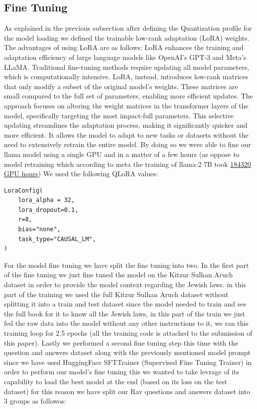 \documentclass[11pt]{article}
\begin{document}
\subsection{Fine Tuning}
As explained in the previous subsection after defining the Quantization profile for the model loading we defined the trainable low-rank adaptation (LoRA) weights. The advantages of using LoRA are as follows:  
LoRA enhances the training and adaptation efficiency of large language models like OpenAI’s GPT-3 and Meta’s LLaMA. Traditional fine-tuning methods require updating all model parameters, which is computationally intensive. LoRA, instead, introduces low-rank matrices that only modify a subset of the original model's weights. These matrices are small compared to the full set of parameters, enabling more efficient updates.
The approach focuses on altering the weight matrices in the transformer layers of the model, specifically targeting the most impact-full parameters. This selective updating streamlines the adaptation process, making it significantly quicker and more efficient. It allows the model to adapt to new tasks or datasets without the need to extensively retrain the entire model.
By doing so we were able to fine our llama model using a single GPU and in a matter of a few hours (as oppose to model retraining which according to meta the training of llama-2 7B took \href{https://huggingface.co/meta-llama/Llama-2-7b-chat-hf}{184320 GPU hours})
We used the following QLoRA values:
\begin{verbatim}
LoraConfig(
    lora_alpha = 32,
    lora_dropout=0.1,
    r=8,
    bias="none",
    task_type="CAUSAL_LM",
)
\end{verbatim}
For the model fine tuning we have split the fine tuning into two.
In the first part of the fine tuning we just fine tuned the model on the Kitzur Sulhan Aruch dataset in order to provide the model context regarding the Jewish laws. in this part of the training we used the full Kitzur Sulhan Aruch dataset without splitting it into a train and test dataset since the model needed to train and see the full book for it to know all the Jewish laws, in this part of the train we just fed the raw data into the model without any other instructions to it, we ran this training loop for 2.5 epochs (all the training code is attached to the submission of this paper).
Lastly we performed a second fine tuning step this time with the question and answers dataset along with the previously mentioned model prompt since we have used HuggingFace SFTTrainer (Supervised Fine Tuning Trainer) in order to perform our model's fine tuning this we wanted to take levrage of its capability to load the best model at the end (based on its loss on the test dataset) for this reason we have split our Rav questions and answers dataset into 3 groups as followos: 
\end{document}

